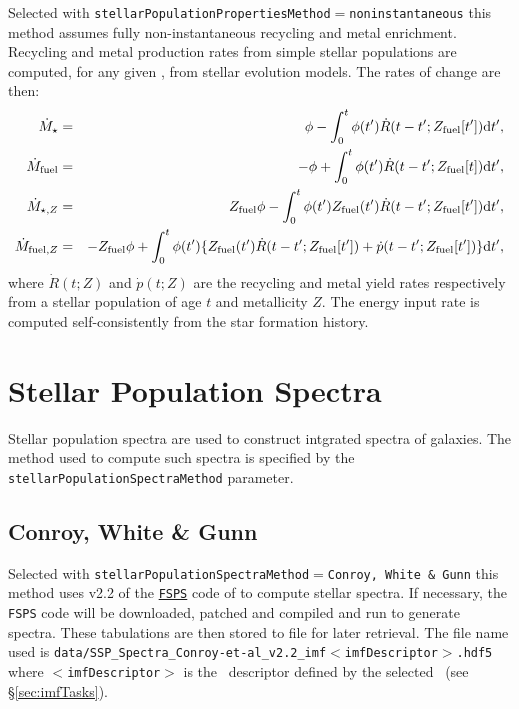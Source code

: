 Selected with {\tt stellarPopulationPropertiesMethod}$=${\tt noninstantaneous} this method assumes fully non-instantaneous recycling and metal enrichment. Recycling and metal production rates from simple stellar populations are computed, for any given \IMF, from stellar evolution models. The rates of change are then:
\begin{eqnarray}
 \dot{M}_\star &=& \phi - \int_0^t \phi(t^\prime) \dot{R}(t-t^\prime;Z_{\rm fuel}[t^\prime]) \d t^\prime, \\
 \dot{M}_{\rm fuel} &=& -\phi + \int_0^t \phi(t^\prime) \dot{R}(t-t^\prime;Z_{\rm fuel}[t]) \d t^\prime, \\
 \dot{M}_{\star,Z} &=& Z_{\rm fuel} \phi - \int_0^t \phi(t^\prime) Z_{\rm fuel}(t^\prime)  \dot{R}(t-t^\prime;Z_{\rm fuel}[t^\prime]) \d t^\prime, \\
 \dot{M}_{{\rm fuel},Z} &=& -Z_{\rm fuel} \phi + \int_0^t  \phi(t^\prime) \{ Z_{\rm fuel}(t^\prime) \dot{R}(t-t^\prime;Z_{\rm fuel}[t^\prime]) + \dot{p}(t-t^\prime;Z_{\rm fuel}[t^\prime]) \} \d t^\prime, \\
\end{eqnarray}
where $\dot{R}(t;Z)$ and $\dot{p}(t;Z)$ are the recycling and metal yield rates respectively from a stellar population of age $t$ and metallicity $Z$. The energy input rate is computed self-consistently from the star formation history.

\section{Stellar Population Spectra}

Stellar population spectra are used to construct intgrated spectra of galaxies. The method used to compute such spectra is specified by the {\tt stellarPopulationSpectraMethod} parameter.

\subsection{Conroy, White \& Gunn}

Selected with {\tt stellarPopulationSpectraMethod}$=${\tt Conroy, White \& Gunn} this method uses v2.2 of the \href{http://www.cfa.harvard.edu/~cconroy/FSPS.html}{{\tt FSPS}} code of \cite{conroy_propagation_2009} to compute stellar spectra. If necessary, the {\tt FSPS} code will be downloaded, patched and compiled and run to generate spectra. These tabulations are then stored to file for later retrieval. The file name used is {\tt data/SSP\_Spectra\_Conroy-et-al\_v2.2\_imf$<$imfDescriptor$>$.hdf5} where $<${\tt imfDescriptor}$>$ is the \IMF\ descriptor defined by the selected \IMF\ (see \S\ref{sec:imfTasks}).

